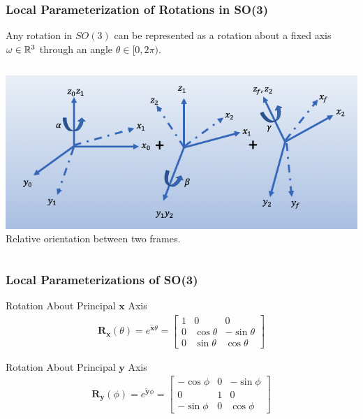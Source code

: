 \begin{frame}
	\frametitle{Local Parameterization of Rotations in SO(3)}
	\begin{theorem}[Euler]
		Any rotation in $SO(3)$ can be represented as a rotation about a fixed axis $\omega\in \mathbb{R}^3$ through an angle $\theta \in [0, 2\pi)$.
	\end{theorem}
	\begin{columns}[]
		\begin{column}{.95\linewidth}
			\centering
			\includegraphics[width=\columnwidth]{../Notes/figures/zyz.png}
			\footnotesize{Relative orientation between two frames.}
		\end{column}
	\end{columns}
\end{frame}


\begin{frame}
	\frametitle{Local Parameterizations of SO(3)}
	\begin{block}{Rotation About Principal $\bm{x}$ Axis}
		\begin{align}
			\bm{R}_{\bm{x}}(\theta) = e^{\tilde{\bm{x}}\theta} 
			= \begin{bmatrix}
				1 & 0 & 0 \\
				0 & \cos\theta & -\sin\theta \\
				0 & \sin\theta & \cos\theta  
			\end{bmatrix}
		\end{align}
	\end{block}
	
	\begin{block}{Rotation About Principal $\bm{y}$ Axis}
		\begin{align}
			\bm{R}_{\bm{y}}(\phi) = e^{\tilde{\bm{y}}\phi} 
			= \begin{bmatrix}
				-\cos\phi & 0 & -\sin\phi \\
				0 & 1 & 0 \\
				-\sin \phi  & 0 & \cos \phi 
			\end{bmatrix}
		\end{align}
	\end{block}
\end{frame}


